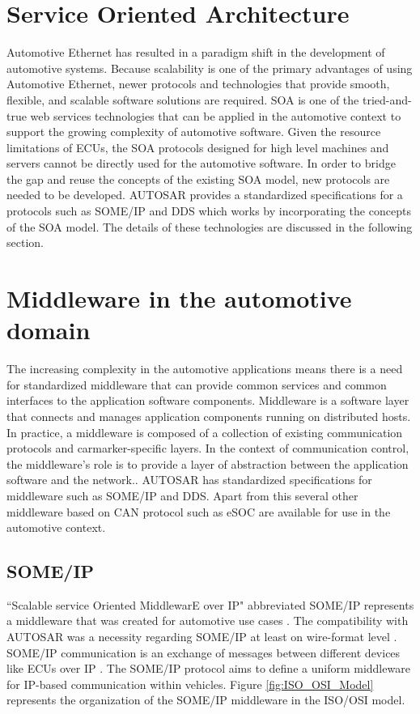 \section{Service Oriented Architecture}
Automotive Ethernet has resulted in a paradigm shift in the development of automotive systems. Because scalability is one of the primary advantages of using Automotive Ethernet, newer protocols and technologies that provide smooth, flexible, and scalable software solutions are required. SOA is one of the tried-and-true web services technologies that can be applied in the automotive context to support the growing complexity of automotive software. Given the resource limitations of ECUs, the SOA protocols designed for high level machines and servers cannot be directly used for the automotive software. In order to bridge the gap and reuse the concepts of the existing SOA model, new protocols are needed to be developed. AUTOSAR provides a standardized specifications for a protocols such as SOME/IP and DDS which works by incorporating the concepts of the SOA model. The details of these technologies are discussed in the following section.   

\section{Middleware in the automotive domain}
The increasing complexity in the automotive applications means there is a need for standardized middleware that can provide common services and common interfaces to the application software components\cite{b_TrendsInACS}. Middleware is a software layer that connects and manages application components running on distributed hosts\cite{b_middleware}. In practice, a middleware is composed of a collection of existing communication protocols and carmarker-specific layers\cite{b_TrendsInACS}. In the context of communication control, the middleware's role is to provide a layer of abstraction between the application software and the network.\cite{b1.4}. AUTOSAR has standardized specifications for middleware such as SOME/IP and DDS\cite{b_TrendsInACS}. Apart from this several other middleware based on CAN protocol such as eSOC\cite{b_TrendsInACS} are available for use in the automotive context. 

\subsection{SOME/IP}
``Scalable service Oriented MiddlewarE over IP" abbreviated SOME/IP represents a middleware that was created for automotive use cases \cite{b1.1}. The compatibility with AUTOSAR was a necessity regarding SOME/IP at least on wire-format level \cite{b1.1}. SOME/IP communication is an exchange of messages between different devices like ECUs over IP \cite{b1.1}. The SOME/IP protocol aims to define a uniform middleware for IP-based communication within vehicles. Figure \ref{fig:ISO_OSI_Model} represents the organization of the SOME/IP middleware in the ISO/OSI model.
\par  

